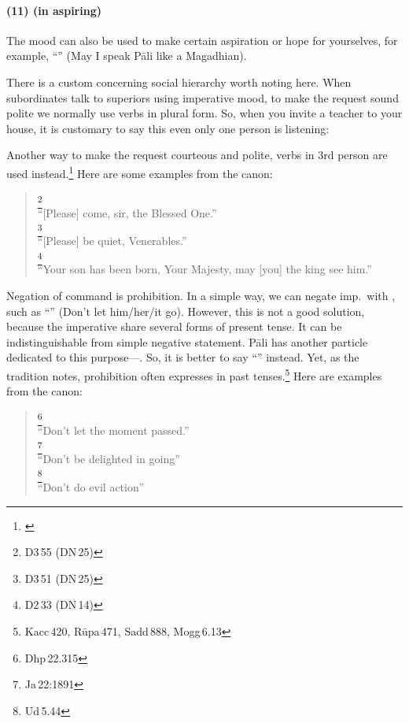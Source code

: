 \paragraph*{(11)  (in aspiring)} The mood can also be used to make certain aspiration or hope for yourselves, for example, ``'' (May I speak P\=ali like a Magadhian).

\bigskip
There is a custom concerning social hierarchy worth noting here. When subordinates talk to superiors using imperative mood, to make the request sound polite we normally use verbs in plural form. So, when you invite a teacher to your house, it is customary to say this even only one person is listening:


Another way to make the request courteous and polite, verbs in 3rd person are used instead.\footnote{\citealp[p.~350]{perniola:grammar}} Here are some examples from the canon:

\begin{quote}
\footnote{D3\,55 (DN\,25)}\\
``[Please] come, sir, the Blessed One.''\\[1.5mm]
\footnote{D3\,51 (DN\,25)}\\
``[Please] be quiet, Venerables.''\\[1.5mm]
\footnote{D2\,33 (DN\,14)}\\
``Your son has been born, Your Majesty, may [you] the king see him.''\\[1.5mm]
\end{quote}

Negation of command is prohibition. In a simple way, we can negate imp.\ with , such as ``'' (Don't let him/her/it go). However, this is not a good solution, because the imperative share several forms of present tense. It can be indistinguishable from simple negative statement. P\=ali has another particle dedicated to this purpose---. So, it is better to say ``'' instead. Yet, as the tradition notes, prohibition often expresses in past tenses.\footnote{Kacc\,420, R\=upa\,471, Sadd\,888, Mogg\,6.13} Here are examples from the canon:

\begin{quote}
\footnote{Dhp\,22.315} \\
``Don't let the moment passed.'' \\[2mm]
\footnote{Ja\,22:1891} \\
``Don't be delighted in going'' \\[2mm]
\footnote{Ud\,5.44} \\
``Don't do evil action''
\end{quote}

